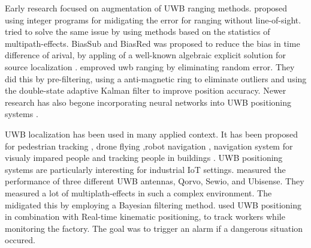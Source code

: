 Early research focused on augmentation of UWB ranging methods.
\cite{venkatesh2007nlos} proposed using integer programs for midigating the error for ranging without line-of-sight.
\cite{guvencc2007nlos} tried to solve the same issue by using methods based on the statistics of multipath-effects.
BiasSub and BiasRed was proposed to reduce the bias in time difference of arival, by appling of a well-known algebraic explicit solution for source localization  \cite{ho2012bias}.
\cite{fan2017performance} emproved uwb ranging by eliminating random error. They did this by pre-filtering, using a anti-magnetic ring to eliminate outliers and using the double-state adaptive Kalman filter to improve position accuracy.
Newer research has also begone incorporating neural networks into UWB positioning systems \cite{stahlke2020nlos, ridolfi2021uwb, che2020machine}.

UWB localization has been used in many applied context.
It has been proposed for pedestrian tracking \cite{otim2019effects}, drone flying \cite{macoir2019uwb},robot navigation \cite{zhu2020adapted}, navigation system for visualy impared people \cite{rosiak2024effectiveness} and tracking people in buildings \cite{elbaum2024investigating}.
UWB positioning systems are particularly interesting for industrial IoT settings.
\cite{barbieri2021uwb} measured the performance of three different UWB antennas, Qorvo, Sewio, and Ubisense. They measured a lot of multiplath-effects in such a complex environment. The midigated this by employing a Bayesian filtering method.
\cite{belli2024cloud} used UWB positioning in combination with Real-time kinematic positioning, to track workers while monitoring the factory. The goal was to trigger an alarm if a dangerous situation occured.

